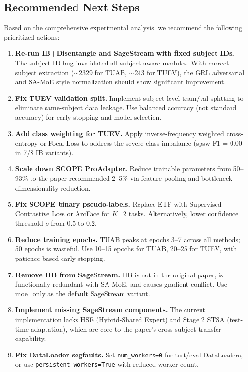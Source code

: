 \documentclass{article}
\begin{document}
\subsection{Recommended Next Steps}
\label{sec:nextsteps}

Based on the comprehensive experimental analysis, we recommend the following prioritized actions:

\begin{enumerate}
\item[\textbf{P0}] \textbf{Re-run IB+Disentangle and SageStream with fixed subject IDs.} The subject ID bug invalidated all subject-aware modules. With correct subject extraction ($\sim$2329 for TUAB, $\sim$243 for TUEV), the GRL adversarial and SA-MoE style normalization should show significant improvement.

\item[\textbf{P0}] \textbf{Fix TUEV validation split.} Implement subject-level train/val splitting to eliminate same-subject data leakage. Use balanced accuracy (not standard accuracy) for early stopping and model selection.

\item[\textbf{P0}] \textbf{Add class weighting for TUEV.} Apply inverse-frequency weighted cross-entropy or Focal Loss to address the severe class imbalance (spsw F1 = 0.00 in 7/8 IB variants).

\item[\textbf{P1}] \textbf{Scale down SCOPE ProAdapter.} Reduce trainable parameters from 50--93\% to the paper-recommended 2--5\% via feature pooling and bottleneck dimensionality reduction.

\item[\textbf{P1}] \textbf{Fix SCOPE binary pseudo-labels.} Replace ETF with Supervised Contrastive Loss or ArcFace for $K$=2 tasks. Alternatively, lower confidence threshold $\rho$ from 0.5 to 0.2.

\item[\textbf{P1}] \textbf{Reduce training epochs.} TUAB peaks at epochs 3--7 across all methods; 50 epochs is wasteful. Use 10--15 epochs for TUAB, 20--25 for TUEV, with patience-based early stopping.

\item[\textbf{P2}] \textbf{Remove IIB from SageStream.} IIB is not in the original paper, is functionally redundant with SA-MoE, and causes gradient conflict. Use moe\_only as the default SageStream variant.

\item[\textbf{P2}] \textbf{Implement missing SageStream components.} The current implementation lacks HSE (Hybrid-Shared Expert) and Stage 2 STSA (test-time adaptation), which are core to the paper's cross-subject transfer capability.

\item[\textbf{P2}] \textbf{Fix DataLoader segfaults.} Set \texttt{num\_workers=0} for test/eval DataLoaders, or use \texttt{persistent\_workers=True} with reduced worker count.
\end{enumerate}
\end{document}
